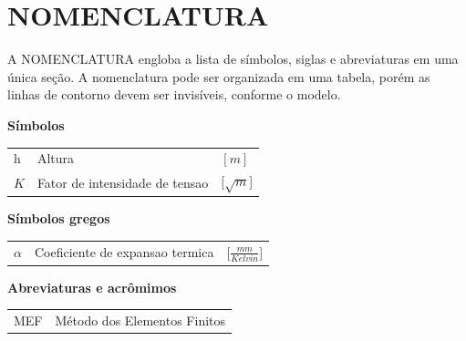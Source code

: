 \section*{\MakeUppercase{Nomenclatura}}
A NOMENCLATURA engloba a lista de símbolos, siglas e abreviaturas em uma única seção. A nomenclatura pode ser organizada em uma tabela, porém as linhas de contorno devem ser invisíveis, conforme o modelo.

\vspace{1\baselineskip}
\textbf{Símbolos}

\vspace{0.5\baselineskip}
\begin{tabular}{l l l}
    $\textit{h}$ & Altura & $[m]$ \\
    $K$ & Fator de intensidade de tensao & [$\sqrt{m}$]
\end{tabular}

\vspace{1\baselineskip}
\textbf{Símbolos gregos}

\vspace{0.5\baselineskip}
\begin{tabular}{l l l}
    $\alpha$ & Coeficiente de expansao termica & [$\frac{mm}{Kelvin}$] \\
\end{tabular}

\vspace{1\baselineskip}
\textbf{Abreviaturas e acrômimos}

\vspace{0.5\baselineskip}
\begin{tabular}{l l}
    MEF & Método dos Elementos Finitos \\
\end{tabular}